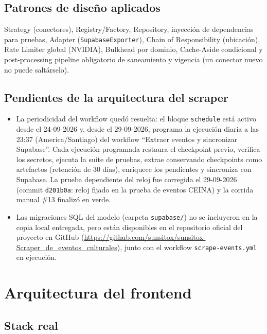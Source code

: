 \subsection{Patrones de diseño aplicados}

Strategy (conectores), Registry/Factory, Repository, inyección de dependencias para pruebas,
Adapter (\texttt{SupabaseExporter}), Chain of Responsibility (ubicación), Rate Limiter global
(NVIDIA), Bulkhead por dominio, Cache-Aside condicional y post-processing pipeline
obligatorio de saneamiento y vigencia (un conector nuevo no puede saltárselo).

\subsection{Pendientes de la arquitectura del scraper}

\begin{itemize}[leftmargin=1.4em]
    \item La periodicidad del workflow quedó resuelta: el bloque \texttt{schedule}
    está activo desde el 24-09-2026 y, desde el 29-09-2026, programa la ejecución
    diaria a las 23:37 (America/Santiago) del workflow ``Extraer eventos y
    sincronizar Supabase''. Cada ejecución programada restaura el checkpoint previo,
    verifica los secretos, ejecuta la suite de pruebas, extrae conservando checkpoints
    como artefactos (retención de 30 días), enriquece los pendientes y sincroniza con
    Supabase. La prueba dependiente del reloj fue corregida el 29-09-2026 (commit
    \texttt{d201b0a}: reloj fijado en la prueba de eventos CEINA) y la corrida manual
    \#13 finalizó en verde.
    \item Las migraciones SQL del modelo (carpeta \texttt{supabase/}) no se incluyeron en
    la copia local entregada, pero están disponibles en el repositorio oficial del
    proyecto en GitHub (\url{https://github.com/sunsitox/sunsitox-Scraper_de_eventos_culturales}),
    junto con el workflow \texttt{scrape-events.yml} en ejecución.
\end{itemize}

\section{Arquitectura del frontend}
\label{sec:frontend}

\subsection{Stack real}

